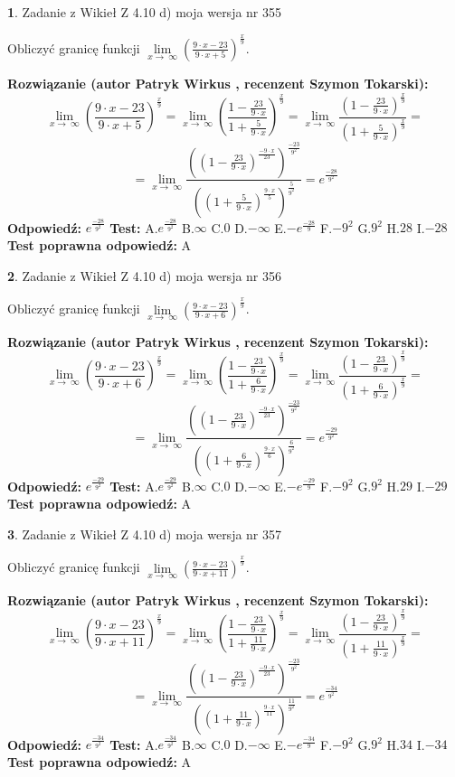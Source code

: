 \documentclass[12pt, a4paper]{article}
\theoremstyle{definition} %
\newtheorem{zad}{}
\newcommand{\zadStart}[1]{\begin{zad}#1\newline}
\newcommand{\zadStop}{\end{zad}}
\newcommand{\rozwStart}[2]{\noindent \textbf{Rozwiązanie (autor #1 , recenzent #2): }\newline}
\newcommand{\rozwStop}{\newline}
\newcommand{\odpStart}{\noindent \textbf{Odpowiedź:}\newline}
\newcommand{\odpStop}{\newline}
\newcommand{\testStart}{\noindent \textbf{Test:}\newline}
\newcommand{\testStop}{\newline}
\newcommand{\kluczStart}{\noindent \textbf{Test poprawna odpowiedź:}\newline}
\newcommand{\kluczStop}{\newline}
\begin{document}
\zadStart{Zadanie z Wikieł Z 4.10 d) moja wersja nr 355}


Obliczyć granicę funkcji  $\lim\limits_{x\to\ \infty}(\frac{9\cdot x-23}{9\cdot x+5})^{\frac{x}{9}}$.
\zadStop
\rozwStart{Patryk Wirkus}{Szymon Tokarski}
$$\lim\limits_{x\to\ \infty}(\frac{9\cdot x-23}{9\cdot x+5})^{\frac{x}{9}} = \lim\limits_{x\to\ \infty}(\frac{1-\frac{23}{9\cdot x}}{1+\frac{5}{9\cdot x}})^{\frac{x}{9}}=\lim\limits_{x\to\ \infty}\frac{(1-\frac{23}{9\cdot x})^{\frac{x}{9}}}{(1+\frac{5}{9\cdot x})^{\frac{x}{9}}}=$$
$$=\lim\limits_{x\to\ \infty}\frac{((1-\frac{23}{9\cdot x})^{\frac{-9\cdot x}{23}})^{\frac{-23}{9^{2}}}}{((1+\frac{5}{9\cdot x})^{\frac{9\cdot x}{5}})^{\frac{5}{9^{2}}}}=e^{\frac{-28}{9^{2}}}$$
\rozwStop
\odpStart
$e^{\frac{-28}{9^{2}}}$
\odpStop
\testStart
A.$e^{\frac{-28}{9^{2}}}$ B.$\infty$ C.$0$ D.$-\infty$ E.$-e^{\frac{-28}{9}}$
F.$-9^{2}$ G.$9^{2}$
H.$28$
I.$-28$
\testStop
\kluczStart
A
\kluczStop



\zadStart{Zadanie z Wikieł Z 4.10 d) moja wersja nr 356}


Obliczyć granicę funkcji  $\lim\limits_{x\to\ \infty}(\frac{9\cdot x-23}{9\cdot x+6})^{\frac{x}{9}}$.
\zadStop
\rozwStart{Patryk Wirkus}{Szymon Tokarski}
$$\lim\limits_{x\to\ \infty}(\frac{9\cdot x-23}{9\cdot x+6})^{\frac{x}{9}} = \lim\limits_{x\to\ \infty}(\frac{1-\frac{23}{9\cdot x}}{1+\frac{6}{9\cdot x}})^{\frac{x}{9}}=\lim\limits_{x\to\ \infty}\frac{(1-\frac{23}{9\cdot x})^{\frac{x}{9}}}{(1+\frac{6}{9\cdot x})^{\frac{x}{9}}}=$$
$$=\lim\limits_{x\to\ \infty}\frac{((1-\frac{23}{9\cdot x})^{\frac{-9\cdot x}{23}})^{\frac{-23}{9^{2}}}}{((1+\frac{6}{9\cdot x})^{\frac{9\cdot x}{6}})^{\frac{6}{9^{2}}}}=e^{\frac{-29}{9^{2}}}$$
\rozwStop
\odpStart
$e^{\frac{-29}{9^{2}}}$
\odpStop
\testStart
A.$e^{\frac{-29}{9^{2}}}$ B.$\infty$ C.$0$ D.$-\infty$ E.$-e^{\frac{-29}{9}}$
F.$-9^{2}$ G.$9^{2}$
H.$29$
I.$-29$
\testStop
\kluczStart
A
\kluczStop



\zadStart{Zadanie z Wikieł Z 4.10 d) moja wersja nr 357}


Obliczyć granicę funkcji  $\lim\limits_{x\to\ \infty}(\frac{9\cdot x-23}{9\cdot x+11})^{\frac{x}{9}}$.
\zadStop
\rozwStart{Patryk Wirkus}{Szymon Tokarski}
$$\lim\limits_{x\to\ \infty}(\frac{9\cdot x-23}{9\cdot x+11})^{\frac{x}{9}} = \lim\limits_{x\to\ \infty}(\frac{1-\frac{23}{9\cdot x}}{1+\frac{11}{9\cdot x}})^{\frac{x}{9}}=\lim\limits_{x\to\ \infty}\frac{(1-\frac{23}{9\cdot x})^{\frac{x}{9}}}{(1+\frac{11}{9\cdot x})^{\frac{x}{9}}}=$$
$$=\lim\limits_{x\to\ \infty}\frac{((1-\frac{23}{9\cdot x})^{\frac{-9\cdot x}{23}})^{\frac{-23}{9^{2}}}}{((1+\frac{11}{9\cdot x})^{\frac{9\cdot x}{11}})^{\frac{11}{9^{2}}}}=e^{\frac{-34}{9^{2}}}$$
\rozwStop
\odpStart
$e^{\frac{-34}{9^{2}}}$
\odpStop
\testStart
A.$e^{\frac{-34}{9^{2}}}$ B.$\infty$ C.$0$ D.$-\infty$ E.$-e^{\frac{-34}{9}}$
F.$-9^{2}$ G.$9^{2}$
H.$34$
I.$-34$
\testStop
\kluczStart
A
\kluczStop
\end{document}

